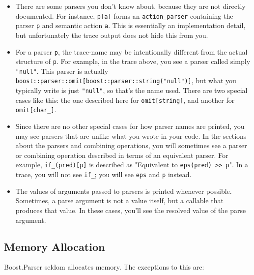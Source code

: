 \begin{itemize}
\item
  There are some parsers you don't know about, because they are not directly documented. For instance, \texttt{p{[}a{]}} forms an \texttt{action\_parser} containing the parser \texttt{p} and semantic action \texttt{a}. This is essentially an implementation detail, but unfortunately the trace output does not hide this from you.
\item
  For a parser \texttt{p}, the trace-name may be intentionally different from the actual structure of \texttt{p}. For example, in the trace above, you see a parser called simply \texttt{"null"}. This parser is actually \texttt{boost::parser::omit{[}boost::parser::string("null"){]}}, but what you typically write is just \texttt{"null"}, so that's the name used. There are two special cases like this: the one described here for \texttt{omit{[}string{]}}, and another for \texttt{omit{[}char\_{]}}.
\item
  Since there are no other special cases for how parser names are printed, you may see parsers that are unlike what you wrote in your code. In the sections about the parsers and combining operations, you will sometimes see a parser or combining operation described in terms of an equivalent parser. For example, \texttt{if\_(pred){[}p{]}} is described as "Equivalent to \texttt{eps(pred) >> p}". In a trace, you will not see \texttt{if\_}; you will see \texttt{eps} and \texttt{p} instead.
\item
  The values of arguments passed to parsers is printed whenever possible. Sometimes, a parse argument is not a value itself, but a callable that produces that value. In these cases, you'll see the resolved value of the parse argument.
\end{itemize}

\subsection{Memory Allocation}

Boost.Parser seldom allocates memory. The exceptions to this are:

